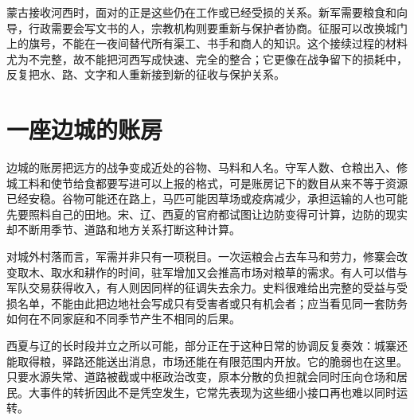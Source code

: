 蒙古接收河西时，面对的正是这些仍在工作或已经受损的关系。新军需要粮食和向导，行政需要会写文书的人，宗教机构则要重新与保护者协商。征服可以改换城门上的旗号，不能在一夜间替代所有渠工、书手和商人的知识。这个接续过程的材料尤为不完整，故不能把河西写成快速、完全的整合；它更像在战争留下的损耗中，反复把水、路、文字和人重新接到新的征收与保护关系。

\section{一座边城的账房}

边城的账房把远方的战争变成近处的谷物、马料和人名。守军人数、仓粮出入、修城工料和使节给食都要写进可以上报的格式，可是账房记下的数目从来不等于资源已经安稳。谷物可能还在路上，马匹可能因草场或疫病减少，承担运输的人也可能先要照料自己的田地。宋、辽、西夏的官府都试图让边防变得可计算，边防的现实却不断用季节、道路和地方关系打断这种计算。

对城外村落而言，军需并非只有一项税目。一次运粮会占去车马和劳力，修寨会改变取木、取水和耕作的时间，驻军增加又会推高市场对粮草的需求。有人可以借与军队交易获得收入，有人则因同样的征调失去余力。史料很难给出完整的受益与受损名单，不能由此把边地社会写成只有受害者或只有机会者；应当看见同一套防务如何在不同家庭和不同季节产生不相同的后果。

西夏与辽的长时段并立之所以可能，部分正在于这种日常的协调反复奏效：城寨还能取得粮，驿路还能送出消息，市场还能在有限范围内开放。它的脆弱也在这里。只要水源失常、道路被截或中枢政治改变，原本分散的负担就会同时压向仓场和居民。大事件的转折因此不是凭空发生，它常先表现为这些细小接口再也难以同时运转。

